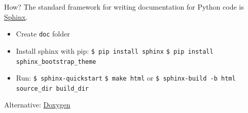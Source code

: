 \documentclass[compress,english,aspectratio=1610]{beamer}
\let\olditem\item
\renewcommand{\item}{\setlength{\itemsep}{\fill}\olditem}
\begin{document}
\begin{frame}{How?}
	The standard framework for writing documentation for Python code is
    \href{https://www.sphinx-doc.org/en/master/}{Sphinx}.
    \begin{itemize}
        \item Create {\tt doc} folder
        \item Install sphinx with pip: \newline
        {\tt \$ pip install sphinx} \newline
        {\tt \$ pip install sphinx\_bootstrap\_theme} \newline

        \item Run: \newline
        {\tt \$ sphinx-quickstart} \newline
        {\tt \$ make html} \newline
        or \newline
        {\tt \$ sphinx-build -b html source\_dir build\_dir} \newline
    \end{itemize}
    Alternative: \href{https://www.doxygen.nl/index.html}{Doxygen}
\end{frame}
\end{document}
